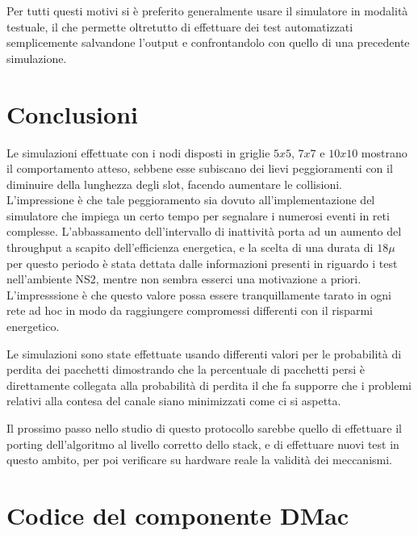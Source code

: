 \documentclass[twoside,11pt,a4paper,italian,openany]{book}
\begin{document}
Per tutti questi motivi si è preferito generalmente usare il simulatore in modalità testuale, 
il che permette oltretutto di effettuare dei test automatizzati semplicemente salvandone
 l'output e confrontandolo con quello di una precedente simulazione. 


\chapter{Conclusioni}
Le simulazioni effettuate con i nodi disposti in griglie $5x5$, $7x7$ e $10x10$ mostrano il
comportamento atteso, sebbene esse subiscano dei lievi peggioramenti con il diminuire della 
lunghezza degli slot, facendo aumentare le collisioni.
L'impressione è che tale peggioramento sia dovuto all'implementazione del simulatore 
che impiega un certo tempo per segnalare i numerosi eventi in reti complesse. 
L'abbassamento dell'intervallo di inattività porta ad un aumento del throughput 
a scapito dell'efficienza energetica, e la scelta di una durata di $18\mu$ per questo periodo 
è stata dettata dalle informazioni presenti in \cite{DMAC} riguardo i test nell'ambiente 
NS2, mentre non sembra esserci una motivazione a priori. L'impresssione è che questo valore 
possa essere tranquillamente tarato in ogni rete ad hoc in modo da raggiungere compromessi 
differenti con il risparmi energetico. 

Le simulazioni sono state effettuate usando differenti valori per le probabilità di perdita 
dei pacchetti dimostrando che la percentuale di pacchetti persi è direttamente collegata  
alla probabilità di perdita il che fa supporre che i problemi relativi alla contesa del 
canale siano minimizzati come ci si aspetta. 


Il prossimo passo nello studio di questo protocollo sarebbe quello di effettuare il 
porting dell'algoritmo al livello corretto dello stack, e di effettuare nuovi test in questo 
ambito, per poi verificare su hardware reale la validità dei meccanismi. 

\appendix
\lstset{
  basicstyle=\small,
  numbers=left, 
  stepnumber=5, 
  numbersep=8pt,
  frame=L,
  }
\chapter{Codice del componente DMac}
\end{document}
